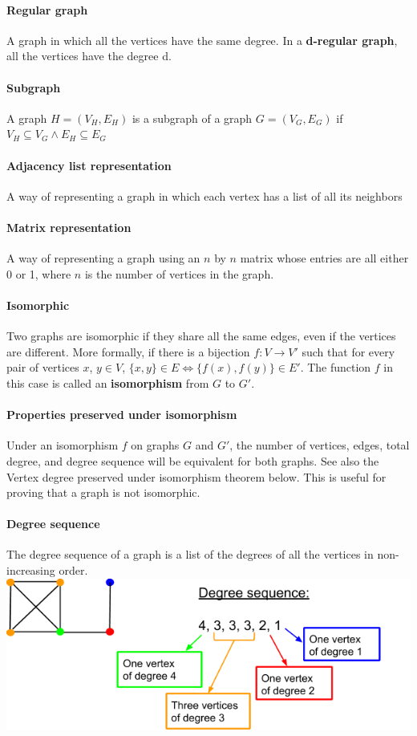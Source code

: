 \documentclass[a4paper]{article}
\begin{document}
  \paragraph{Regular graph} A graph in which all the vertices have the same degree. In a \textbf{d-regular graph}, all the vertices have the degree d.
  \paragraph{Subgraph} A graph $H = (V_H, E_H)$ is a subgraph of a graph $G = (V_G, E_G)$ if $V_H \subseteq V_G \land E_H \subseteq E_G$
  \paragraph{Adjacency list representation} A way of representing a graph in which each vertex has a list of all its neighbors
  \paragraph{Matrix representation} A way of representing a graph using an $n$ by $n$ matrix whose entries are all either 0 or 1, where $n$ is the number of vertices in the graph.
  \paragraph{Isomorphic} Two graphs are isomorphic if they share all the same edges, even if the vertices are different. More formally, if there is a bijection $f: V \to V'$ such that for every pair of vertices $x$, $y \in V$, $\{x, y\} \in E \iff \{f(x), f(y)\} \in E'$. The function $f$ in this case is called an \textbf{isomorphism} from $G$ to $G'$.
  \paragraph{Properties preserved under isomorphism} Under an isomorphism $f$ on graphs $G$ and $G'$, the number of vertices, edges, total degree, and degree sequence will be equivalent for both graphs. See also the Vertex degree preserved under isomorphism theorem below. This is useful for proving that a graph is not isomorphic.
  \paragraph{Degree sequence} The degree sequence of a graph is a list of the degrees of all the vertices in non-increasing order.
  \includegraphics[width=6.5in]{degree-sequence.png}
\end{document}
